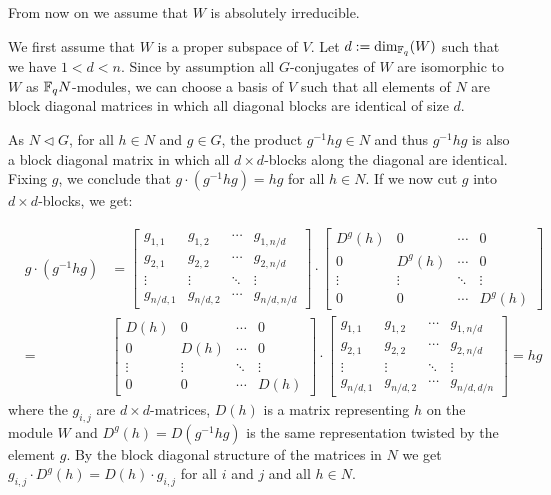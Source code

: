 From now on we assume that $W$ is absolutely irreducible.

We first assume that $W$ is a proper subspace of $V$. Let $d :=
\dim_{\mathbb{F}_q}(W)$ such that we have $1 < d < n$. Since by assumption 
all $G$-conjugates of $W$ are isomorphic to $W$ as $\mathbb{F}_q N$-modules,
we can choose a basis of $V$ such that all elements of $N$ are block
diagonal matrices in which all diagonal blocks are identical of size
$d$.

As $N \triangleleft G$, for all $h \in N$ and $g \in G$,
 the product $g^{-1}hg \in N$ and thus $g^{-1} h g$ is also 
a block diagonal matrix in which all $d \times d$-blocks along the diagonal
are identical. Fixing $g$, we conclude that $g\cdot (g^{-1}hg) = hg$ for all
$h \in N$. If we now cut $g$ into $d \times d$-blocks, we get:

\begin{eqnarray*}
   &g \cdot (g^{-1}hg) & 
 = \left[ \begin{array}{c|c|c|c}
      g_{1,1} & g_{1,2} & \cdots & g_{1,n/d} \\ \hline
      g_{2,1} & g_{2,2} & \cdots & g_{2,n/d} \\ \hline
      \vdots  & \vdots  & \ddots & \vdots    \\ \hline
      g_{n/d,1}&g_{n/d,2}& \cdots& g_{n/d,n/d} \end{array} \right]
\cdot \left[ \begin{array}{c|c|c|c}
      D^g(h) & 0   & \cdots &      0    \\ \hline
         0   &D^g(h)&\cdots &      0    \\ \hline
      \vdots  & \vdots  & \ddots & \vdots    \\ \hline
         0    &    0    & \cdots& D^g(h) \end{array} \right] \\
 &=& \left[ \begin{array}{c|c|c|c}
      D(h)    & 0       & \cdots &     0    \\ \hline
         0    &D(h)     &\cdots &      0    \\ \hline
      \vdots  & \vdots  & \ddots & \vdots    \\ \hline
         0    &    0    & \cdots& D(h)   \end{array} \right]
\cdot \left[ \begin{array}{c|c|c|c}
      g_{1,1} & g_{1,2} & \cdots & g_{1,n/d} \\ \hline
      g_{2,1} & g_{2,2} & \cdots & g_{2,n/d} \\ \hline
      \vdots  & \vdots  & \ddots & \vdots    \\ \hline
      g_{n/d,1}&g_{n/d,2}& \cdots& g_{n/d,d/n} \end{array} \right]
 = hg
\end{eqnarray*}
where the $g_{i,j}$ are $d \times d$-matrices, $D(h)$ is a matrix
representing $h$ on the module $W$ and $D^g(h) = D(g^{-1}hg)$ is the
same representation twisted by the element $g$. By the block diagonal
structure of the matrices in $N$ we get 
$g_{i,j} \cdot D^g(h) = D(h) \cdot g_{i,j}$ for all $i$ and $j$ and 
all $h \in N$.

